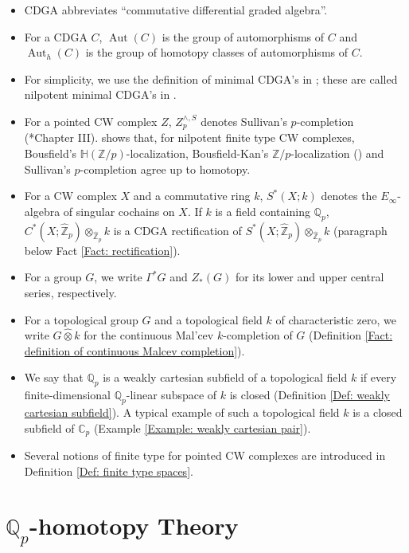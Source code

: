 \documentclass[11pt]{amsart}
\theoremstyle{definition}
\numberwithin{equation}{section}
\numberwithin{equation}{section}
\newcommand\QQ{\mathbb{Q}}
\newcommand\CC{\mathbb{C}}
\newcommand\ZZ{\mathbb{Z}}
\DeclareMathOperator{\Aut}{Aut}
\begin{document}
\begin{itemize}[leftmargin=0.25in]
    \item CDGA abbreviates ``commutative differential graded algebra''.
    \item For a CDGA $C$, $\Aut(C)$ is the group of automorphisms of $C$ and $\Aut_h(C)$ is the group of homotopy classes of automorphisms of $C$.
    \item For simplicity, we use the definition of minimal CDGA's in \cite{Deligne-Griffiths-Morgan-Sullivan-formality}\cite{Morgan-hodge-theory}; these are called nilpotent minimal CDGA's in \cite{Sullivan-rational-homotopy}.
    \item For a pointed CW complex $Z$, $Z^{\wedge,S}_{p}$ denotes Sullivan's $p$-completion (\cite{Sullivan-MIT-notes}*{Chapter III}). \cite[Section 2.3]{Barthel-Bousfield-Comparison-of-p-completion} shows that, for nilpotent finite type  CW complexes, Bousfield's $\mathbb{H}(\ZZ/p)$-localization, Bousfield-Kan's $\ZZ/p$-localization (\cite{Bousfield-Kan-homotopy-limits-completions-localizations}) and Sullivan's $p$-completion agree up to homotopy.
    \item For a CW complex $X$ and a commutative ring $k$, $S^*(X;k)$ denotes the $E_{\infty}$-algebra of singular cochains on $X$. If $k$ is a field containing $\QQ_p$, $C^*(X;\widehat{\ZZ}_p)\otimes_{\widehat{\ZZ}_p}k$ is a CDGA rectification of $S^*(X;\widehat{\ZZ}_p)\otimes_{\widehat{\ZZ}_p}k$ (paragraph below Fact \ref{Fact: rectification}).
    \item For a group $G$, we write $\Gamma^*G$ and $Z_*(G)$ for its lower and upper central series, respectively.
    \item For a topological group $G$ and a topological field $k$ of characteristic zero, we write $G\widehat{\otimes } k$ for the continuous Mal'cev $k$-completion of $G$ (Definition \ref{Fact: definition of continuous Malcev completion}).
    \item We say that $\QQ_p$ is a weakly cartesian subfield of a topological field $k$ if every finite-dimensional $\QQ_p$-linear subspace of $k$ is closed (Definition \ref{Def: weakly cartesian subfield}). A typical example of such a topological field $k$ is a closed subfield of $\CC_p$ (Example \ref{Example: weakly cartesian pair}).
    \item Several notions of finite type for pointed CW complexes are introduced in Definition \ref{Def: finite type spaces}.
\end{itemize}

\section{$\QQ_p$-homotopy Theory}\label{Section: Q_p homotopy theory}
\end{document}
